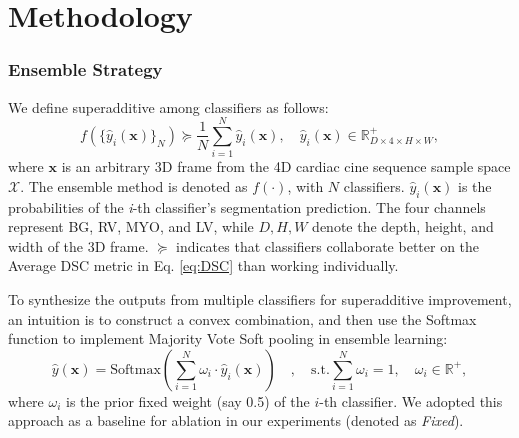 \section{Methodology}
\subsubsection{Ensemble Strategy} We define superadditive among classifiers as follows:
    \begin{equation}
        f(\{\hat{y}_{i}(\textbf{x})\}_{N}) \succeq \frac{1}{N} \sum_{i=1}^{N} \hat{y}_{i}(\textbf{x}), \quad \hat{y}_{i}(\textbf{x}) \in \mathbb{R}^{+}_{D \times 4 \times H \times W},
    \end{equation}
where $\textbf{x}$ is an arbitrary 3D frame from the 4D cardiac cine sequence sample space $\mathcal{X}$. The ensemble method is denoted as \( f(\cdot) \), with \( N \) classifiers. \(\hat{y}_{i}(\textbf{x})\) is the probabilities of the \textit{i}-th classifier’s segmentation prediction. The four channels represent BG, RV, MYO, and LV, while \(D, H, W\) denote the depth, height, and width of the 3D frame. $\succeq$ indicates that classifiers collaborate better on the Average DSC metric in Eq. \ref{eq:DSC} than working individually.

To synthesize the outputs from multiple classifiers for superadditive improvement, an intuition is to construct a convex combination, and then use the Softmax function to implement Majority Vote Soft pooling in ensemble learning:
\begin{equation}
\hat{y}(\textbf{x}) = \text{Softmax}\left(\sum_{\textit{i}=1}^{\textit{N}} \omega_{\textit{i}} \cdot \hat{y}_{\textit{i}}(\textbf{x})\right) \quad , \quad \text{s.t.}\sum_{\textit{i}=1}^{\textit{N}} \omega_{\textit{i}} = 1, \quad \omega_{\textit{i}} \in \mathbb{R^{+}},
\end{equation}
where $\omega_{i}$ is the prior fixed weight (say 0.5) of the $i$-th classifier. We adopted this approach as a baseline for ablation in our experiments (denoted as \textit{Fixed}). 

